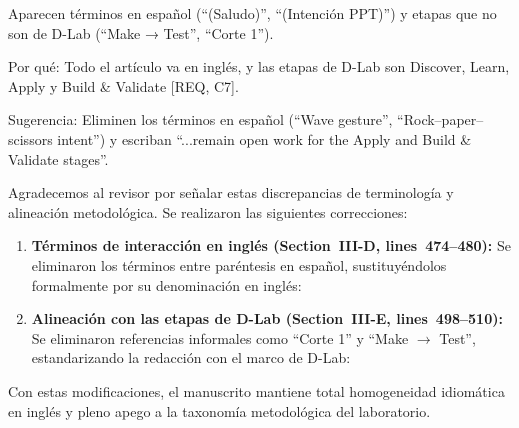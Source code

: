 \documentclass{LabDSTresponse}
\begin{document}
{Aparecen términos en español (“(Saludo)”, “(Intención PPT)”) y etapas que no son de D-Lab (“Make → Test”, “Corte 1”).

Por qué: Todo el artículo va en inglés, y las etapas de D-Lab son Discover, Learn, Apply y Build \& Validate [REQ, C7].

Sugerencia: Eliminen los términos en español (“Wave gesture”, “Rock–paper–scissors intent”) y escriban “...remain open work for the Apply and Build \& Validate stages”.}
{Agradecemos al revisor por señalar estas discrepancias de terminología y alineación metodológica. Se realizaron las siguientes correcciones:
\begin{enumerate}
    \item \textbf{Términos de interacción en inglés (Section~III-D, lines~474--480):} Se eliminaron los términos entre paréntesis en español, sustituyéndolos formalmente por su denominación en inglés:
    \item \textbf{Alineación con las etapas de D-Lab (Section~III-E, lines~498--510):} Se eliminaron referencias informales como “Corte 1” y “Make $\to$ Test”, estandarizando la redacción con el marco de D-Lab:
\end{enumerate}
Con estas modificaciones, el manuscrito mantiene total homogeneidad idiomática en inglés y pleno apego a la taxonomía metodológica del laboratorio.}
\end{document}
